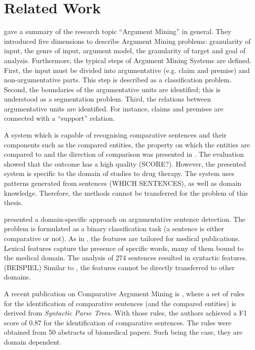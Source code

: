 \section{Related Work}
\label{sec:argth}
\label{sec:argmine}
\cite{Lippi2016Argumentation-M} gave a summary of the research topic \enquote{Argument Mining} in general. They introduced five dimensions to describe Argument Mining problems: granularity of input, the genre of input, argument model, the granularity of target and goal of analysis.  Furthermore, the typical steps of Argument Mining Systems are defined. First, the input must be divided into argumentative (e.g. claim and premise) and non-argumentative parts. This step is described as a classification problem. Second, the boundaries of the argumentative units are identified; this is understood as a segmentation problem. Third, the relations between argumentative units are identified. For instance, claims and premises are connected with a \enquote{support} relation.




A system which is capable of recognising comparative sentences and their components such as the compared entities, the property on which the entities are compared to and the direction of comparison was presented in \cite{fiszman2007interpreting}. The evaluation showed that the outcome has a high quality (SCORE?). However, the presented system is specific to the domain of studies to drug therapy. The system uses patterns generated from sentences (WHICH SENTENCES), as well as domain knowledge. Therefore, the methods cannot be transferred for the problem of this thesis.

\cite{park2012identifying} presented a domain-specific approach on argumentative sentence detection. The problem is formulated as a binary classification task (a sentence is either comparative or not). As in \cite{fiszman2007interpreting}, the features are tailored for medical publications. Lexical features capture the presence of specific words, many of them bound to the medical domain. The analysis of 274 sentences resulted in syntactic features. (BEISPIEL) Similar to \cite{fiszman2007interpreting}, the features cannot be directly transferred to other domains.

A recent publication on Comparative Argument Mining is \cite{gupta2017identifying}, where a set of rules for the identification of comparative sentences (and the compared entities) is derived from \emph{Syntactic Parse Trees}. With those rules, the authors achieved a F1 score of 0.87 for the identification of comparative sentences. The rules were obtained from 50 abstracts of biomedical papers. Such being the case, they are domain dependent.\newline

